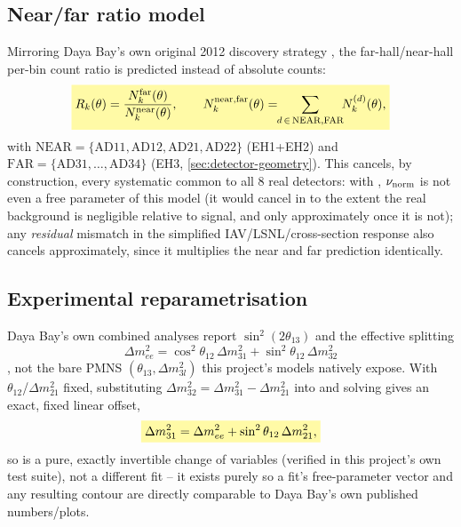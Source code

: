 \subsection*{Near/far ratio model}

\begin{theorybox}
Mirroring Daya Bay's own original 2012 discovery strategy
\parencite{An2012DayaBayDiscovery}, the far-hall/near-hall per-bin count
ratio is predicted instead of absolute counts:
\begin{equation}
  \keyresult{R_k(\theta) = \frac{N_k^{\rm far}(\theta)}{N_k^{\rm near}(\theta)},
    \qquad N_k^{\rm near,far}(\theta) = \!\!\sum_{d\,\in\,{\rm NEAR,FAR}}\!\! N_k^{(d)}(\theta),}
  \label{eq:nearfar-ratio}
\end{equation}
with $\mathrm{NEAR}=\{\mathrm{AD11,AD12,AD21,AD22}\}$ (EH1+EH2) and
$\mathrm{FAR}=\{\mathrm{AD31,\dots,AD34}\}$ (EH3,
\cref{sec:detector-geometry}). This cancels, by construction, every
systematic common to all 8 real detectors: with , $\nu_{\rm norm}$ is not even a free parameter of this model (it
would cancel in  to the extent the real
background is negligible relative to signal, and only approximately once
it is not); any \emph{residual} mismatch in the simplified IAV/LSNL/cross-section
response also cancels approximately, since it multiplies the near and far
prediction identically.
\end{theorybox}

\subsection*{Experimental reparametrisation}

\begin{theorybox}
Daya Bay's own combined analyses report $\sin^2(2\theta_{13})$ and the
effective splitting
\begin{equation}
  \Delta m^2_{ee} = \cos^2\theta_{12}\,\Delta m^2_{31} + \sin^2\theta_{12}\,\Delta m^2_{32}
  \label{eq:dm2ee-definition}
\end{equation}
\parencite{NunokawaParkeZukanovich2005,An2023DayaBayPrecision}, not the bare
PMNS $(\theta_{13},\Delta m^2_{3l})$ this project's models natively expose.
With $\theta_{12}$/$\Delta m^2_{21}$ fixed, substituting $\Delta
m^2_{32}=\Delta m^2_{31}-\Delta m^2_{21}$ into
 and solving gives an exact, fixed linear
offset,
\begin{equation}
  \keyresult{\Delta m^2_{31} = \Delta m^2_{ee} + \sin^2\theta_{12}\,\Delta m^2_{21},}
  \label{eq:dm31-from-dm2ee}
\end{equation}
so  is a pure, exactly invertible change
of variables (verified in this project's own test suite), not a different
fit -- it exists purely so a fit's free-parameter vector and any resulting
contour are directly comparable to Daya Bay's own published numbers/plots.
\end{theorybox}

